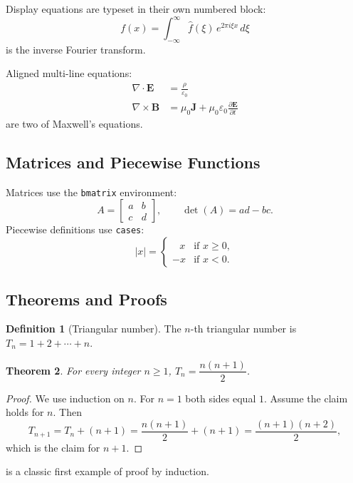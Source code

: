 \documentclass[12pt, a4paper]{article}
\theoremstyle{plain}
\newtheorem{theorem}{Theorem}[section]
\theoremstyle{definition}
\newtheorem{definition}[theorem]{Definition}
\begin{document}
Display equations are typeset in their own numbered block:
\begin{equation}
    f(x) = \int_{-\infty}^{\infty} \hat{f}(\xi)\,e^{2\pi i \xi x}\,d\xi
    \label{eq:fourier}
\end{equation}
 is the inverse Fourier transform.

Aligned multi-line equations:
\begin{align}
    \nabla \cdot  \mathbf{E} &= \frac{\rho}{\varepsilon_0} \label{eq:gauss} \\
    \nabla \times \mathbf{B} &= \mu_0 \mathbf{J} + \mu_0\varepsilon_0 \frac{\partial\mathbf{E}}{\partial t} \label{eq:ampere}
\end{align}
 are two of Maxwell's equations.

\subsection{Matrices and Piecewise Functions}
Matrices use the \texttt{bmatrix} environment:
\begin{equation}
    A = \begin{bmatrix} a & b \\ c & d \end{bmatrix},
    \qquad
    \det(A) = ad - bc.
\end{equation}
Piecewise definitions use \texttt{cases}:
\begin{equation}
    |x| =
    \begin{cases}
        \;\;\,x & \text{if } x \ge 0, \\
        -x & \text{if } x < 0.
    \end{cases}
\end{equation}

\subsection{Theorems and Proofs}
\begin{definition}[Triangular number]
The $n$-th triangular number is $T_n = 1 + 2 + \cdots + n$.
\end{definition}

\begin{theorem}\label{thm:gauss}
For every integer $n \ge 1$, $T_n = \dfrac{n(n+1)}{2}$.
\end{theorem}
\begin{proof}
We use induction on $n$. For $n=1$ both sides equal $1$. Assume the claim holds for $n$. Then
\[
    T_{n+1} = T_n + (n+1) = \frac{n(n+1)}{2} + (n+1) = \frac{(n+1)(n+2)}{2},
\]
which is the claim for $n+1$.
\end{proof}
 is a classic first example of proof by induction.
\end{document}
